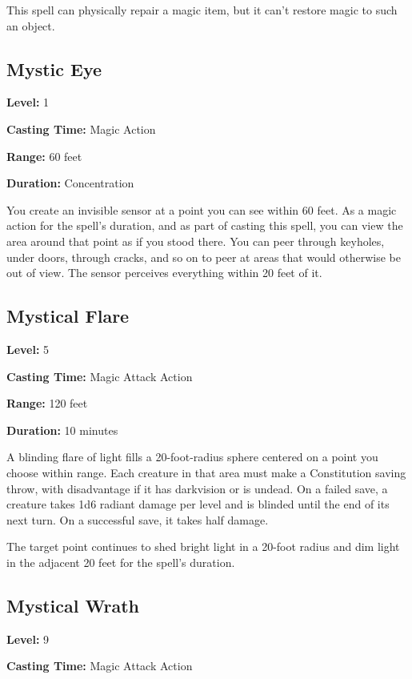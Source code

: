\documentclass[12pt,letterpaper,twocolumn,openany,nodeprecatedcode,bg=none]{dndbook}
\begin{document}
This spell can physically repair a magic item, but it can't restore
magic to such an object.

\subsection{Mystic Eye}\label{mystic-eye}

\textbf{Level:} 1

\textbf{Casting Time:} Magic Action

\textbf{Range:} 60 feet

\textbf{Duration:} Concentration

You create an invisible sensor at a point you can see within 60 feet. As
a magic action for the spell's duration, and as part of casting this
spell, you can view the area around that point as if you stood there.
You can peer through keyholes, under doors, through cracks, and so on to
peer at areas that would otherwise be out of view. The sensor perceives
everything within 20 feet of it.

\clearpage

\subsection{Mystical Flare}\label{mystical-flare}

\textbf{Level:} 5

\textbf{Casting Time:} Magic Attack Action

\textbf{Range:} 120 feet

\textbf{Duration:} 10 minutes

A blinding flare of light fills a 20-foot-radius sphere centered on a
point you choose within range. Each creature in that area must make a
Constitution saving throw, with disadvantage if it has darkvision or is
undead. On a failed save, a creature takes 1d6 radiant damage per level
and is blinded until the end of its next turn. On a successful save, it
takes half damage.

The target point continues to shed bright light in a 20-foot radius and
dim light in the adjacent 20 feet for the spell's duration.

\subsection{Mystical Wrath}\label{mystical-wrath}

\textbf{Level:} 9

\textbf{Casting Time:} Magic Attack Action
\end{document}
